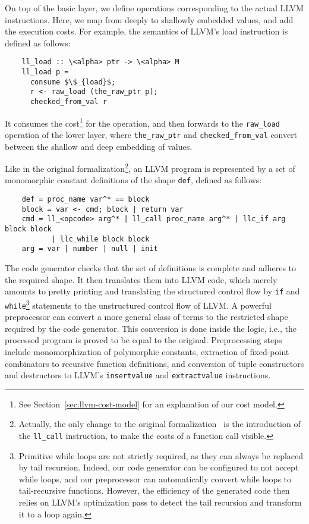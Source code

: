 \documentclass[acmsmall]{acmart}
\newcommand{\is}{\lstinline[language=isabelle]}
\begin{document}
On top of the basic layer, we define operations corresponding to the actual LLVM instructions. Here, we map from deeply to shallowly embedded values, and add the execution costs. 
\clearpage
For example, the semantics of LLVM's load instruction is defined as follows:
\begin{lstlisting}
    ll_load :: \<alpha> ptr -> \<alpha> M 
    ll_load p =
      consume $\$_{load}$;
      r <- raw_load (the_raw_ptr p);
      checked_from_val r
\end{lstlisting}
It consumes the cost\footnote{See Section~\ref{sec:llvm-cost-model} for an explanation of our cost model.} for the operation, and then forwards to the \is{raw_load} operation of the lower layer, where \is{the_raw_ptr} and \is{checked_from_val} convert between the shallow and deep embedding of values.


Like in the original formalization\footnote{Actually, the only change to the original formalization~\cite{lammich2019LLVM} is the introduction of the \is{ll_call} instruction, to make the costs of a function call visible.}, an LLVM program is represented by a set
of monomorphic constant definitions of the shape \is{def}, defined as follows:
\begin{lstlisting}
    def = proc_name var^* == block
    block = var <- cmd; block | return var
    cmd = ll_<opcode> arg^* | ll_call proc_name arg^* | llc_if arg block block 
           | llc_while block block
    arg = var | number | null | init
\end{lstlisting}
The code generator checks that the set of definitions is complete and adheres to the required shape. It then translates them into LLVM code, which merely amounts to pretty printing and translating the structured control flow by \is{if} and \is{while}\footnote{Primitive while loops are not strictly required, as they can always be replaced by tail recursion. Indeed, our code generator can be configured to not accept while loops, and our preprocessor can automatically convert while loops to tail-recursive functions. However, the efficiency of the generated code then relies on LLVM's optimization pass to detect the tail recursion and transform it to a loop again.} statements to the unstructured control flow of LLVM. A powerful preprocessor can convert a more general class of terms to the restricted shape required by the code generator. This conversion is done inside the logic, i.e., the processed program is proved to be equal to the original. Preprocessing steps include monomorphization of polymorphic constants, extraction of fixed-point combinators to recursive function definitions, and conversion of tuple constructors and destructors to LLVM's \is{insertvalue} and \is{extractvalue} instructions.
\end{document}
